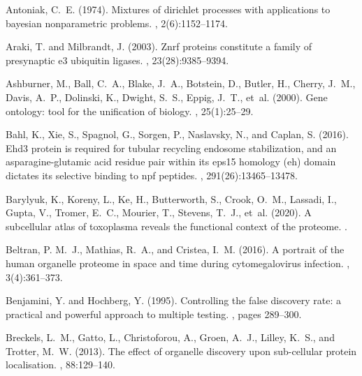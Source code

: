\documentclass[12pt,english]{article}
\begin{document}
\clearpage
%
% 

\begin{thebibliography}{}

Antoniak, C.~E. (1974).
\newblock Mixtures of dirichlet processes with applications to bayesian
  nonparametric problems.
, 2(6):1152--1174.

Araki, T. and Milbrandt, J. (2003).
\newblock Znrf proteins constitute a family of presynaptic e3 ubiquitin
  ligases.
, 23(28):9385--9394.

Ashburner, M., Ball, C.~A., Blake, J.~A., Botstein, D., Butler, H., Cherry,
  J.~M., Davis, A.~P., Dolinski, K., Dwight, S.~S., Eppig, J.~T., et~al.
  (2000).
\newblock Gene ontology: tool for the unification of biology.
, 25(1):25--29.

Bahl, K., Xie, S., Spagnol, G., Sorgen, P., Naslavsky, N., and Caplan, S.
  (2016).
\newblock Ehd3 protein is required for tubular recycling endosome
  stabilization, and an asparagine-glutamic acid residue pair within its eps15
  homology (eh) domain dictates its selective binding to npf peptides.
, 291(26):13465--13478.

Barylyuk, K., Koreny, L., Ke, H., Butterworth, S., Crook, O.~M., Lassadi, I.,
  Gupta, V., Tromer, E.~C., Mourier, T., Stevens, T.~J., et~al. (2020).
\newblock A subcellular atlas of toxoplasma reveals the functional context of
  the proteome.
.

Beltran, P. M.~J., Mathias, R.~A., and Cristea, I.~M. (2016).
\newblock A portrait of the human organelle proteome in space and time during
  cytomegalovirus infection.
, 3(4):361--373.

Benjamini, Y. and Hochberg, Y. (1995).
\newblock Controlling the false discovery rate: a practical and powerful
  approach to multiple testing.
, pages 289--300.

Breckels, L.~M., Gatto, L., Christoforou, A., Groen, A.~J., Lilley, K.~S., and
  Trotter, M.~W. (2013).
\newblock The effect of organelle discovery upon sub-cellular protein
  localisation.
, 88:129--140.


\end{thebibliography}
\end{document}
